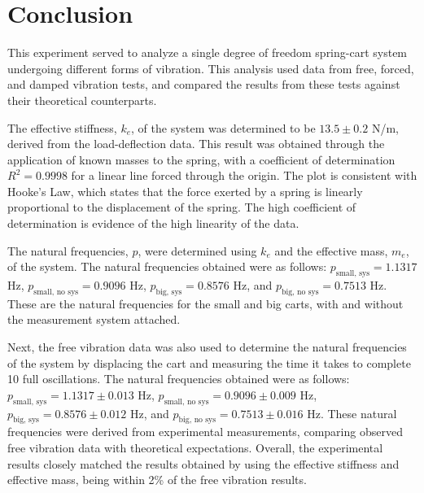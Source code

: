 \section{Conclusion}
This experiment served to analyze a single degree of freedom spring-cart system undergoing different forms of vibration. This analysis used data from free, forced, and damped vibration tests, and compared the results from these tests against their theoretical counterparts.

The effective stiffness, $k_e$, of the system was determined to be $13.5 \pm 0.2$ N/m, derived from the load-deflection data. This result was obtained through the application of known masses to the spring, with a coefficient of determination $R^2 = 0.9998$ for a linear line forced through the origin. The plot is consistent with Hooke's Law, which states that the force exerted by a spring is linearly proportional to the displacement of the spring. The high coefficient of determination is evidence of the high linearity of the data.

The natural frequencies, $p$, were determined using $k_e$ and the effective mass, $m_e$, of the system. The natural frequencies obtained were as follows: $p_{\text{small, sys}} = 1.1317$ Hz, $p_{\text{small, no sys}} = 0.9096$ Hz, $p_{\text{big, sys}} = 0.8576$ Hz, and $p_{\text{big, no sys}} = 0.7513$ Hz. These are the natural frequencies for the small and big carts, with and without the measurement system attached. 

Next, the free vibration data was also used to determine the natural frequencies of the system by displacing the cart and measuring the time it takes to complete 10 full oscillations. The natural frequencies obtained were as follows: $p_{\text{small, sys}} = 1.1317 \pm 0.013$ Hz, $p_{\text{small, no sys}} = 0.9096 \pm 0.009$ Hz, $p_{\text{big, sys}} = 0.8576 \pm 0.012$ Hz, and $p_{\text{big, no sys}} = 0.7513 \pm 0.016$ Hz. These natural frequencies were derived from experimental measurements, comparing observed free vibration data with theoretical expectations. Overall, the experimental results closely matched the results obtained by using the effective stiffness and effective mass, being within 2\% of the free vibration results.

